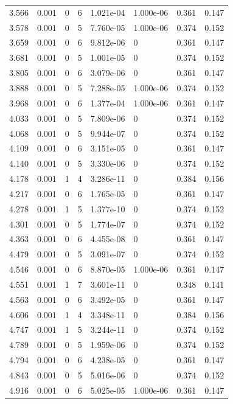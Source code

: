 \documentclass[preview]{standalone}
\begin{document}
{{{\begin{tabular}{L{1.2cm}C{1.2cm} C{0.3cm}C{0.5cm} C{1.4cm}C{1.4cm} C{1.4cm}C{1.4cm}}
  3.566  &  0.001  & 0     &  6 &  1.021e-04  & 1.000e-06  & 0.361 &  0.147   \\ 
  3.578  &  0.001  & 0     &  5 &  7.760e-05  & 1.000e-06  & 0.374 &  0.152   \\ 
  3.659  &  0.001  & 0     &  6 &  9.812e-06  & 0  & 0.361 &  0.147   \\ 
  3.681  &  0.001  & 0     &  5 &  1.001e-05  & 0  & 0.374 &  0.152   \\ 
  3.805  &  0.001  & 0     &  6 &  3.079e-06  & 0  & 0.361 &  0.147   \\ 
  3.888  &  0.001  & 0     &  5 &  7.288e-05  & 1.000e-06  & 0.374 &  0.152   \\ 
  3.968  &  0.001  & 0     &  6 &  1.377e-04  & 1.000e-06  & 0.361 &  0.147   \\ 
  4.033  &  0.001  & 0     &  5 &  7.809e-06  & 0  & 0.374 &  0.152   \\ 
  4.068  &  0.001  & 0     &  5 &  9.944e-07  & 0  & 0.374 &  0.152   \\ 
  4.109  &  0.001  & 0     &  6 &  3.151e-05  & 0  & 0.361 &  0.147   \\ 
  4.140  &  0.001  & 0     &  5 &  3.330e-06  & 0  & 0.374 &  0.152   \\ 
  4.178  &  0.001  & 1     &  4 &  3.286e-11  & 0  & 0.384 &  0.156   \\ 
  4.217  &  0.001  & 0     &  6 &  1.765e-05  & 0  & 0.361 &  0.147   \\ 
  4.278  &  0.001  & 1     &  5 &  1.377e-10  & 0  & 0.374 &  0.152   \\ 
  4.301  &  0.001  & 0     &  5 &  1.774e-07  & 0  & 0.374 &  0.152   \\ 
  4.363  &  0.001  & 0     &  6 &  4.455e-08  & 0  & 0.361 &  0.147   \\ 
  4.479  &  0.001  & 0     &  5 &  3.091e-07  & 0  & 0.374 &  0.152   \\ 
  4.546  &  0.001  & 0     &  6 &  8.870e-05  & 1.000e-06  & 0.361 &  0.147   \\ 
  4.551  &  0.001  & 1     &  7 &  3.601e-11  & 0  & 0.348 &  0.141   \\ 
  4.563  &  0.001  & 0     &  6 &  3.492e-05  & 0  & 0.361 &  0.147   \\ 
  4.606  &  0.001  & 1     &  4 &  3.348e-11  & 0  & 0.384 &  0.156   \\ 
  4.747  &  0.001  & 1     &  5 &  3.244e-11  & 0  & 0.374 &  0.152   \\ 
  4.789  &  0.001  & 0     &  5 &  1.959e-06  & 0  & 0.374 &  0.152   \\ 
  4.794  &  0.001  & 0     &  6 &  4.238e-05  & 0  & 0.361 &  0.147   \\ 
  4.843  &  0.001  & 0     &  5 &  5.016e-06  & 0  & 0.374 &  0.152   \\ 
  4.916  &  0.001  & 0     &  6 &  5.025e-05  & 1.000e-06  & 0.361 &  0.147   \\ 
\hline 
\end{tabular} 

}}}
\end{document}

